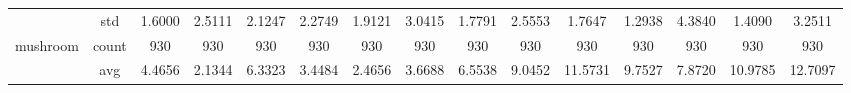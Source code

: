 \begin{table}[htbp]
{\begin{tabular}{rcccc|c|c|c|c|c|ccccc}
			                                                                               & std                                    & 1.6000                                                                             & 2.5111                                                                    & 2.1247                                                                    & 2.2749                                         & 1.9121                                                                    & 3.0415                                       & 1.7791                                      & 2.5553                                         & 1.7647                                         & 1.2938                                          & 4.3840                                          & 1.4090                                         & 3.2511                                         \\
			mushroom                                                                       & count                                  & 930                                                                                & 930                                                                       & 930                                                                       & 930                                            & 930                                                                       & 930                                          & 930                                         & 930                                            & 930                                            & 930                                             & 930                                             & 930                                            & 930                                            \\
			                                                                               & avg                                    & 4.4656                                                                             & \cellcolor[rgb]{ .776,  .937,  .808}\textcolor[rgb]{ 0,  .38,  0}{2.1344} & 6.3323                                                                    & 3.4484                                         & 2.4656                                                                    & 3.6688                                       & 6.5538                                      & 9.0452                                         & 11.5731                                        & 9.7527                                          & 7.8720                                          & 10.9785                                        & 12.7097                                        \\

\end{tabular}}
\end{table}
